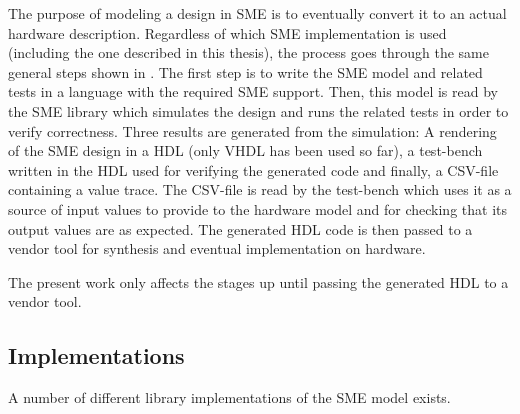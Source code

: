 The purpose of modeling a design in SME is to eventually convert it to an actual
hardware description. Regardless of which SME implementation is used (including
the one described in this thesis), the process goes through the same general
steps shown in . The first step is to write the SME model and
related tests in a language with the required SME support. Then, this model is
read by the SME library which simulates the design and runs the related tests in
order to verify correctness. Three results are generated from the simulation: A
rendering of the SME design in a HDL (only VHDL has been used so far), a
test-bench written in the HDL used for verifying the generated code and finally,
a CSV-file containing a value trace. The CSV-file is read by the test-bench
which uses it as a source of input values to provide to the hardware model and
for checking that its output values are as expected. The generated HDL code is
then passed to a vendor tool for synthesis and eventual implementation on
hardware.

The present work only affects the stages up until passing the generated HDL to a
vendor tool.






\subsection{Implementations}
A number of different library implementations of the SME model exists.


